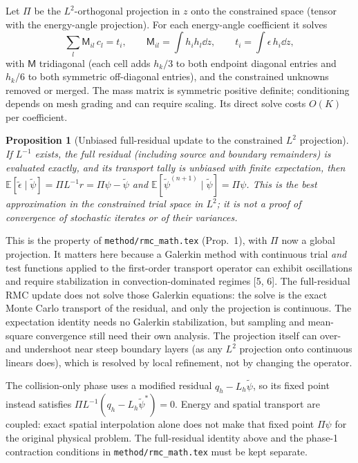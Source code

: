 \documentclass[11pt]{article}
\newtheorem{proposition}{Proposition}
\newcommand{\tpsi}{\tilde\psi}
\newcommand{\teps}{\tilde\epsilon}
\newcommand{\E}{\mathbb{E}}
\begin{document}
Let $\Pi$ be the $L^2$-orthogonal projection in $z$ onto the constrained space (tensor
with the energy-angle projection). For each energy-angle coefficient it solves
\begin{equation}
  \sum_l \mathsf M_{il}\,c_l = t_i,\qquad
  \mathsf M_{il} = \int h_ih_l\dd z,\qquad t_i = \int \epsilon\,h_i\dd z,
  \label{eq:mass}
\end{equation}
with $\mathsf M$ tridiagonal (each cell adds $h_k/3$ to both endpoint diagonal
entries and $h_k/6$ to both symmetric off-diagonal entries), and the constrained
unknowns removed or merged. The mass matrix is symmetric positive definite;
conditioning depends on mesh grading and can require scaling. Its direct solve costs
$O(K)$ per coefficient.

\begin{proposition}[Unbiased full-residual update to the constrained $L^2$ projection]
If $L^{-1}$ exists, the full residual (including source and boundary remainders) is
evaluated exactly, and its transport tally is unbiased with finite expectation, then
$\E[\teps\mid\tpsi]=\Pi L^{-1}r=\Pi\psi-\tpsi$ and
$\E[\tpsi^{(n+1)}\mid\tpsi]=\Pi\psi$. This is the best approximation in the
constrained trial space in $L^2$; it is not a proof of convergence of stochastic
iterates or of their variances.
\end{proposition}

\noindent This is the property of \texttt{method/rmc\_math.tex} (Prop.~1), with $\Pi$ now a
global projection. It matters here because a Galerkin method with continuous trial
\emph{and} test functions applied to the first-order transport operator can exhibit
oscillations and require stabilization in convection-dominated regimes [5, 6].
The full-residual RMC update does not solve those Galerkin
equations: the solve is the exact Monte Carlo transport of the residual, and only the
projection is continuous. The expectation identity needs no Galerkin stabilization,
but sampling and mean-square convergence still need their own analysis. The projection itself can
over- and undershoot near steep boundary layers (as any $L^2$ projection onto
continuous linears does), which is resolved by local refinement, not by changing the
operator.

The collision-only phase uses a modified residual $q_h-L_h\tpsi$, so its fixed
point instead satisfies $\Pi L^{-1}(q_h-L_h\tpsi^*)=0$. Energy and spatial
transport are coupled: exact spatial interpolation alone does not make that fixed
point $\Pi\psi$ for the original physical problem. The full-residual identity
above and the phase-1 contraction conditions in \texttt{method/rmc\_math.tex} must be
kept separate.
\end{document}
